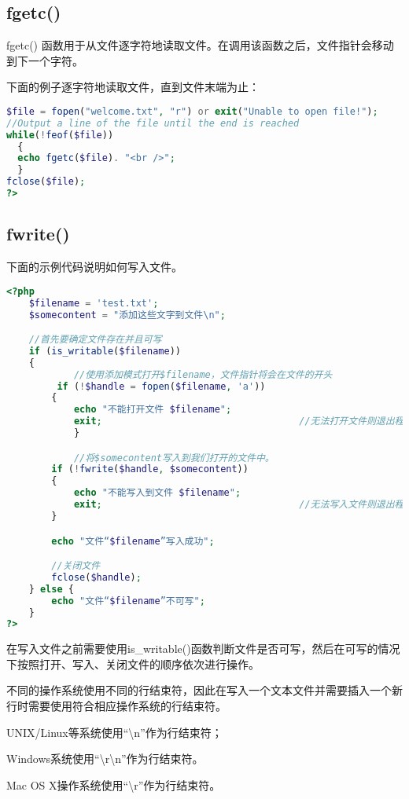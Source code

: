 \subsection{fgetc()}


fgetc() 函数用于从文件逐字符地读取文件。在调用该函数之后，文件指针会移动到下一个字符。

下面的例子逐字符地读取文件，直到文件末端为止：

\begin{lstlisting}[language=PHP]
$file = fopen("welcome.txt", "r") or exit("Unable to open file!");
//Output a line of the file until the end is reached
while(!feof($file))
  {
  echo fgetc($file). "<br />";
  }
fclose($file);
?>
\end{lstlisting}

\subsection{fwrite()}

下面的示例代码说明如何写入文件。

\begin{lstlisting}[language=PHP]
<?php
	$filename = 'test.txt';
	$somecontent = "添加这些文字到文件\n";

	//首先要确定文件存在并且可写
	if (is_writable($filename))
	{
    		//使用添加模式打开$filename，文件指针将会在文件的开头
	     if (!$handle = fopen($filename, 'a')) 
		{
			echo "不能打开文件 $filename";
			exit;									//无法打开文件则退出程序
    		}

    		//将$somecontent写入到我们打开的文件中。
		if (!fwrite($handle, $somecontent)) 
		{
			echo "不能写入到文件 $filename";
			exit;									//无法写入文件则退出程序
		}

		echo "文件“$filename”写入成功";

		//关闭文件
		fclose($handle);
	} else {
		echo "文件“$filename”不可写";
	}
?>
\end{lstlisting}


在写入文件之前需要使用is\_writable()函数判断文件是否可写，然后在可写的情况下按照打开、写入、关闭文件的顺序依次进行操作。

不同的操作系统使用不同的行结束符，因此在写入一个文本文件并需要插入一个新行时需要使用符合相应操作系统的行结束符。

\begin{compactitem}
\item UNIX/Linux等系统使用“\textbackslash n”作为行结束符；
\item Windows系统使用“\textbackslash r\textbackslash n”作为行结束符。
\item Mac OS X操作系统使用“\textbackslash r”作为行结束符。
\end{compactitem}




